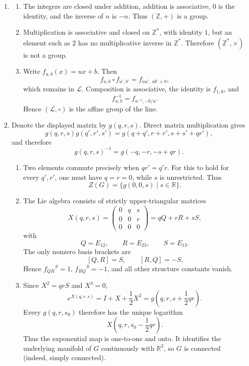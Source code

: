 \begin{enumerate}
\begin{enumerate}
\item[(a)]
  \begin{enumerate}
  \item[(i)] The integers are closed under addition, addition is
  associative, \(0\) is the identity, and the inverse of \(n\) is
  \(-n\).  Thus \((\mathbb Z,+)\) is a group.
  \item[(ii)] Multiplication is associative and closed on
  \(\mathbb Z^*\), with identity \(1\), but an element such as \(2\) has
  no multiplicative inverse in \(\mathbb Z^*\).  Therefore
  \((\mathbb Z^*,\times)\) is not a group.
  \item[(iii)] Write \(f_{u,b}(x)=ux+b\).  Then
  \[
   f_{u,b}\circ f_{u',b'}=f_{uu',\,ub'+b},
  \]
  which remains in \(\mathcal L\).  Composition is associative, the
  identity is \(f_{1,0}\), and
  \[
   f_{u,b}^{-1}=f_{u^{-1},-b/u}.
  \]
  Hence \((\mathcal L,\circ)\) is the affine group of the line.
  \end{enumerate}

\item[(b)] Denote the displayed matrix by \(g(q,r,s)\).  Direct matrix
multiplication gives
\[
 g(q,r,s)g(q',r',s')
 =g(q+q',r+r',s+s'+qr'),
\]
and therefore
\[
 g(q,r,s)^{-1}=g(-q,-r,-s+qr).
\]
  \begin{enumerate}
  \item[(i)] Two elements commute precisely when
  \(qr'=q'r\).  For this to hold for every \(q',r'\), one must have
  \(q=r=0\), while \(s\) is unrestricted.  Thus
  \[
   Z(G)=\{g(0,0,s)\mid s\in\mathbb R\}.
  \]

  \item[(ii)] The Lie algebra consists of strictly upper-triangular
  matrices
  \[
   X(q,r,s)=
   \begin{pmatrix}0&q&s\\0&0&r\\0&0&0\end{pmatrix}
   =qQ+rR+sS,
  \]
  with
  \[
   Q=E_{12},\qquad R=E_{23},\qquad S=E_{13}.
  \]
  The only nonzero basis brackets are
  \[
   [Q,R]=S,\qquad [R,Q]=-S.
  \]
  Hence \(f_{QR}{}^S=1\), \(f_{RQ}{}^S=-1\), and all other structure
  constants vanish.

  \item[(iii)] Since \(X^2=qrS\) and \(X^3=0\),
  \[
   e^{X(q,r,s)}=I+X+\frac12X^2
   =g\!\left(q,r,s+\frac12qr\right).
  \]
  Every \(g(q,r,s_0)\) therefore has the unique logarithm
  \[
   X\!\left(q,r,s_0-\frac12qr\right).
  \]
  Thus the exponential map is one-to-one and onto.  It identifies the
  underlying manifold of \(G\) continuously with \(\mathbb R^3\), so
  \(G\) is connected (indeed, simply connected).


\end{enumerate}
\end{enumerate}
\end{enumerate}
